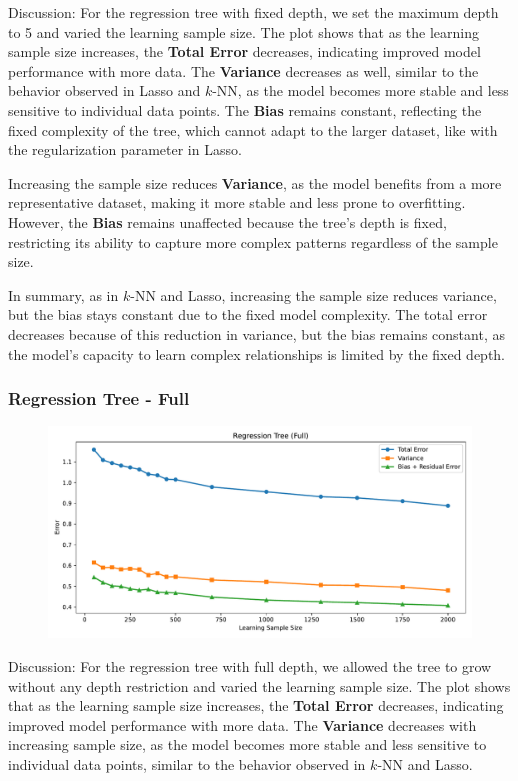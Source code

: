 \documentclass[a4paper,10pt]{article}
\begin{document}
Discussion:  
For the regression tree with fixed depth, we set the maximum depth to 5 and varied the learning sample size. The plot shows that as the learning sample size increases, the \textbf{Total Error} decreases, indicating improved model performance with more data. The \textbf{Variance} decreases as well, similar to the behavior observed in Lasso and \(k\)-NN, as the model becomes more stable and less sensitive to individual data points. The \textbf{Bias} remains constant, reflecting the fixed complexity of the tree, which cannot adapt to the larger dataset, like with the regularization parameter in Lasso.

Increasing the sample size reduces \textbf{Variance}, as the model benefits from a more representative dataset, making it more stable and less prone to overfitting. However, the \textbf{Bias} remains unaffected because the tree's depth is fixed, restricting its ability to capture more complex patterns regardless of the sample size.

In summary, as in \(k\)-NN and Lasso, increasing the sample size reduces variance, but the bias stays constant due to the fixed model complexity. The total error decreases because of this reduction in variance, but the bias remains constant, as the model's capacity to learn complex relationships is limited by the fixed depth.


\subsubsection{Regression Tree - Full}

\begin{figure}[H]
    \centering
    \includegraphics[width=0.8\linewidth]{images/2.4_rt_full.pdf}
\end{figure}

Discussion:  
For the regression tree with full depth, we allowed the tree to grow without any depth restriction and varied the learning sample size. The plot shows that as the learning sample size increases, the \textbf{Total Error} decreases, indicating improved model performance with more data. The \textbf{Variance} decreases with increasing sample size, as the model becomes more stable and less sensitive to individual data points, similar to the behavior observed in \(k\)-NN and Lasso.
\end{document}
